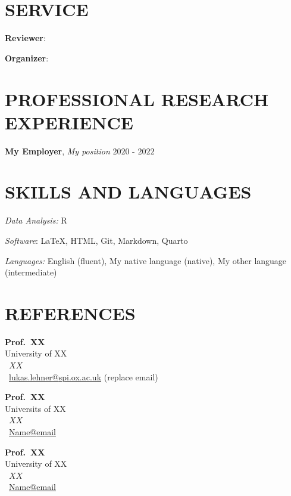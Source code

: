\documentclass[11pt,]{article}
\providecommand{\tightlist}{%
  \setlength{\itemsep}{0pt}\setlength{\parskip}{0pt}}
\renewenvironment{itemize}{
  \begin{list}{}{
    \setlength{\leftmargin}{1.5em}
  }
}{
  \end{list}
}
\begin{document}
\section{SERVICE}\label{service}

\begin{itemize}
\tightlist
\item
  \textbf{Reviewer}:
\item
  \textbf{Organizer}:
\end{itemize}

\section{PROFESSIONAL RESEARCH
EXPERIENCE}\label{professional-research-experience}

\begin{itemize}
\tightlist
\item
  \textbf{My Employer}, \emph{My position} \hfill \(2020\) - \(2022\)
\end{itemize}

\section{SKILLS AND LANGUAGES}\label{skills-and-languages}

\begin{itemize}
\tightlist
\item
  \emph{Data Analysis:} R
\item
  \emph{Software}: \LaTeX, HTML, Git, Markdown, Quarto
\item
  \emph{Languages:} English (fluent), My native language (native), My
  other language (intermediate)
\end{itemize}

\section{REFERENCES}\label{references}

\begin{paracol}{3}

    \textbf{Prof.\ XX}\\
    University of XX\\
    \Telefon\ \( XX\)\\
    \Letter\ \href{mailto:lukas.lehner@spi.ox.ac.uk}{lukas.lehner\textrm{@}spi.ox.ac.uk} (replace email)

\switchcolumn

    \textbf{Prof.\ XX}\\
    Universits of XX\\
    \Telefon\ \(XX\)\\
    \Letter\ \href{mailto: XX}{Name\textrm{@}email}
    
\switchcolumn

    \textbf{Prof.\ XX}\\
    University of XX\\
    \Telefon\ \(XX\)\\
    \Letter\ \href{mailto: XX}{Name\textrm{@}email}

\end{paracol}

\end{document}
